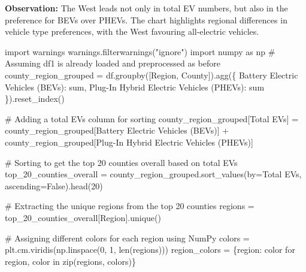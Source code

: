 \documentclass[
  letterpaper,
  DIV=11,
  numbers=noendperiod]{scrartcl}
\newenvironment{Shaded}{\begin{snugshade}}{\end{snugshade}}
\newcommand{\BuiltInTok}[1]{\textcolor[rgb]{0.00,0.23,0.31}{#1}}
\newcommand{\CommentTok}[1]{\textcolor[rgb]{0.37,0.37,0.37}{#1}}
\newcommand{\ControlFlowTok}[1]{\textcolor[rgb]{0.00,0.23,0.31}{#1}}
\newcommand{\DecValTok}[1]{\textcolor[rgb]{0.68,0.00,0.00}{#1}}
\newcommand{\ImportTok}[1]{\textcolor[rgb]{0.00,0.46,0.62}{#1}}
\newcommand{\KeywordTok}[1]{\textcolor[rgb]{0.00,0.23,0.31}{#1}}
\newcommand{\NormalTok}[1]{\textcolor[rgb]{0.00,0.23,0.31}{#1}}
\newcommand{\OperatorTok}[1]{\textcolor[rgb]{0.37,0.37,0.37}{#1}}
\newcommand{\StringTok}[1]{\textcolor[rgb]{0.13,0.47,0.30}{#1}}
\newcommand{\VariableTok}[1]{\textcolor[rgb]{0.07,0.07,0.07}{#1}}
\begin{document}
\textbf{Observation:} The West leads not only in total EV numbers, but
also in the preference for BEVs over PHEVs. The chart highlights
regional differences in vehicle type preferences, with the West
favouring all-electric vehicles.

\begin{Shaded}
\begin{Highlighting}[]
\ImportTok{import}\NormalTok{ warnings}
\NormalTok{warnings.filterwarnings(}\StringTok{"ignore"}\NormalTok{)}
\ImportTok{import}\NormalTok{ numpy }\ImportTok{as}\NormalTok{ np}
\CommentTok{\# Assuming df1 is already loaded and preprocessed as before}
\NormalTok{county\_region\_grouped }\OperatorTok{=}\NormalTok{ df.groupby([}\StringTok{\textquotesingle{}Region\textquotesingle{}}\NormalTok{, }\StringTok{\textquotesingle{}County\textquotesingle{}}\NormalTok{]).agg(\{}
    \StringTok{\textquotesingle{}Battery Electric Vehicles (BEVs)\textquotesingle{}}\NormalTok{: }\StringTok{\textquotesingle{}sum\textquotesingle{}}\NormalTok{, }
    \StringTok{\textquotesingle{}Plug{-}In Hybrid Electric Vehicles (PHEVs)\textquotesingle{}}\NormalTok{: }\StringTok{\textquotesingle{}sum\textquotesingle{}}
\NormalTok{\}).reset\_index()}

\CommentTok{\# Adding a total EVs column for sorting}
\NormalTok{county\_region\_grouped[}\StringTok{\textquotesingle{}Total EVs\textquotesingle{}}\NormalTok{] }\OperatorTok{=}\NormalTok{ county\_region\_grouped[}\StringTok{\textquotesingle{}Battery Electric Vehicles (BEVs)\textquotesingle{}}\NormalTok{] }\OperatorTok{+}\NormalTok{ county\_region\_grouped[}\StringTok{\textquotesingle{}Plug{-}In Hybrid Electric Vehicles (PHEVs)\textquotesingle{}}\NormalTok{]}

\CommentTok{\# Sorting to get the top 20 counties overall based on total EVs}
\NormalTok{top\_20\_counties\_overall }\OperatorTok{=}\NormalTok{ county\_region\_grouped.sort\_values(by}\OperatorTok{=}\StringTok{\textquotesingle{}Total EVs\textquotesingle{}}\NormalTok{, ascending}\OperatorTok{=}\VariableTok{False}\NormalTok{).head(}\DecValTok{20}\NormalTok{)}

\CommentTok{\# Extracting the unique regions from the top 20 counties}
\NormalTok{regions }\OperatorTok{=}\NormalTok{ top\_20\_counties\_overall[}\StringTok{\textquotesingle{}Region\textquotesingle{}}\NormalTok{].unique()}

\CommentTok{\# Assigning different colors for each region using NumPy}
\NormalTok{colors }\OperatorTok{=}\NormalTok{ plt.cm.viridis(np.linspace(}\DecValTok{0}\NormalTok{, }\DecValTok{1}\NormalTok{, }\BuiltInTok{len}\NormalTok{(regions)))}
\NormalTok{region\_colors }\OperatorTok{=}\NormalTok{ \{region: color }\ControlFlowTok{for}\NormalTok{ region, color }\KeywordTok{in} \BuiltInTok{zip}\NormalTok{(regions, colors)\}}


\end{Highlighting}
\end{Shaded}
\end{document}
